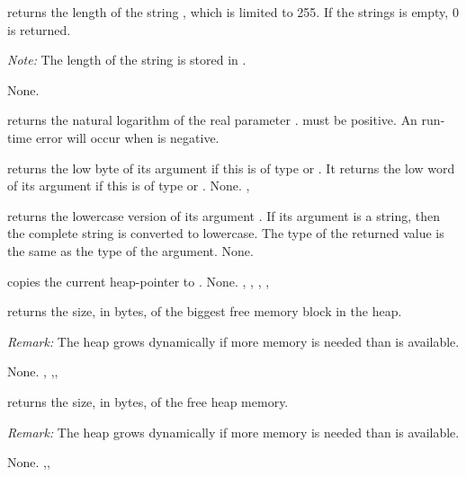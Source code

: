 \documentclass{report}
\begin{document}


{ returns the length of the string ,
which is limited to 255. If the strings  is empty, 0 is returned.

{\em Note:} The length of the string  is stored in .
}
{None.}
{}



{
 returns the natural logarithm of the real parameter .
 must be positive.
}
{An run-time error will occur when  is negative.}
{}



{ returns the low byte of its argument if this is of type
 or
. It returns the low word of its argument if this is of type 
 or .}
{None.}
{, }



{ returns the lowercase version of its argument .
If its argument is a string, then the complete string is converted to
lowercase. The type of the returned value is the same as the type of the
argument.}
{None.}
{}



{ copies the current heap-pointer to .}
{None.}
{, , , , }



{ returns the size, in bytes, of the biggest free memory block in
the heap.

{\em Remark:} The heap grows dynamically if more memory is needed than is
available.}
{None.}
{, ,, }



{ returns the size, in bytes, of the free heap memory.

{\em Remark:} The heap grows dynamically if more memory is needed than is
available.}
{None.}
{,, }


\end{document}
